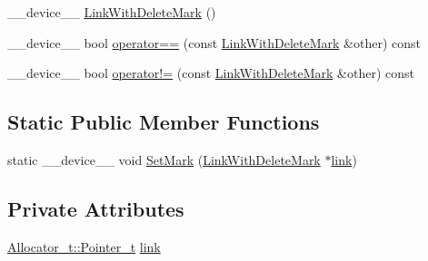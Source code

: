 \begin{DoxyCompactItemize}
\item 
\+\_\+\+\_\+device\+\_\+\+\_\+ \mbox{\hyperlink{class_n_u_c_a_r_lock_free_d_s_1_1_lock_free_doubly_linked_list_1_1_link_with_delete_mark_a7d7dfc1c8216fb02ed3ccaae5684eed3}{Link\+With\+Delete\+Mark}} ()
\item 
\+\_\+\+\_\+device\+\_\+\+\_\+ bool \mbox{\hyperlink{class_n_u_c_a_r_lock_free_d_s_1_1_lock_free_doubly_linked_list_1_1_link_with_delete_mark_afa41d48d9810b94ed0f2b3d1b6fd52a8}{operator==}} (const \mbox{\hyperlink{class_n_u_c_a_r_lock_free_d_s_1_1_lock_free_doubly_linked_list_1_1_link_with_delete_mark}{Link\+With\+Delete\+Mark}} \&other) const
\item 
\+\_\+\+\_\+device\+\_\+\+\_\+ bool \mbox{\hyperlink{class_n_u_c_a_r_lock_free_d_s_1_1_lock_free_doubly_linked_list_1_1_link_with_delete_mark_a347dba997df64a60d2d9bc2d42948c09}{operator!=}} (const \mbox{\hyperlink{class_n_u_c_a_r_lock_free_d_s_1_1_lock_free_doubly_linked_list_1_1_link_with_delete_mark}{Link\+With\+Delete\+Mark}} \&other) const
\end{DoxyCompactItemize}
\subsection*{Static Public Member Functions}
\begin{DoxyCompactItemize}
\item 
static \+\_\+\+\_\+device\+\_\+\+\_\+ void \mbox{\hyperlink{class_n_u_c_a_r_lock_free_d_s_1_1_lock_free_doubly_linked_list_1_1_link_with_delete_mark_afc16efcd81c1c4593f90f37d6360ff1d}{Set\+Mark}} (\mbox{\hyperlink{class_n_u_c_a_r_lock_free_d_s_1_1_lock_free_doubly_linked_list_1_1_link_with_delete_mark}{Link\+With\+Delete\+Mark}} $\ast$\mbox{\hyperlink{class_n_u_c_a_r_lock_free_d_s_1_1_lock_free_doubly_linked_list_1_1_link_with_delete_mark_aa3e6d661a7dfd3ebeca045ddb2fe07dc}{link}})
\end{DoxyCompactItemize}
\subsection*{Private Attributes}
\begin{DoxyCompactItemize}
\item 
\mbox{\hyperlink{class_n_u_c_a_r_lock_free_d_s_1_1_allocator_a3931e84d06ddd3b436103475197eb12a}{Allocator\+\_\+t\+::\+Pointer\+\_\+t}} \mbox{\hyperlink{class_n_u_c_a_r_lock_free_d_s_1_1_lock_free_doubly_linked_list_1_1_link_with_delete_mark_aa3e6d661a7dfd3ebeca045ddb2fe07dc}{link}}
\end{DoxyCompactItemize}
